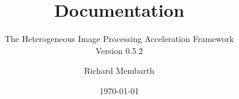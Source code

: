 


\title{\hipacc{} Documentation}
\subtitle{The Heterogeneous Image Processing Acceleration Framework\\Version 0.5.2}
\author{Richard Membarth}
\date{\today}

\maketitle

\cleardoublepage
\tableofcontents
\cleardoublepage






\nocite{membarth2011ggc}
\nocite{membarth2012gdg}
\nocite{membarth2012aoi}
\nocite{membarth2012msv}
\cleardoublepage
\appendix
\printbibliography



